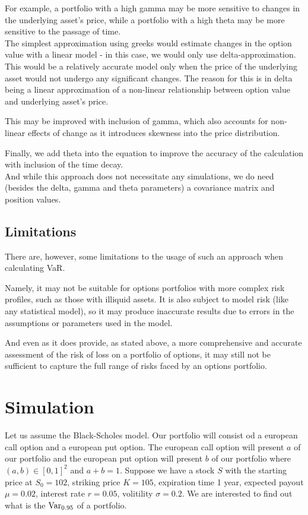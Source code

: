 \documentclass[a4paper, 12pt]{article}
\theoremstyle{definition}
\theoremstyle{plain}
\theoremstyle{definition}
\begin{document}
For example, a portfolio with a high gamma may be 
more sensitive to changes in the 
underlying asset's price, 
while a portfolio with a high theta 
may be more sensitive to the passage 
of time.\\


The simplest approximation using greeks would estimate changes 
in the option value with a linear model - in this case, we would 
only use delta-approximation. This would be a relatively accurate 
model only when the price of the underlying asset would not undergo any 
significant changes. The reason for this is in delta being a linear 
approximation of a non-linear relationship between option value and underlying 
asset's price. 

This may be improved with inclusion of gamma, which also accounts for 
non-linear effects of change as it introduces skewness into the price distribution.


Finally, we add theta into the equation to improve the accuracy of the calculation 
with inclusion of the time decay.\\

And while this approach does not necessitate any simulations,
we do need (besides the delta, gamma and theta 
parameters) a covariance matrix and position values. 



\subsection{Limitations}

There are, however, some limitations to the usage of such an approach
when calculating VaR. 

Namely, it may not be suitable for options portfolios with more complex 
risk profiles, such as those with illiquid assets. 
It is also subject to model risk (like any statistical model),
so it may produce inaccurate results due to errors in the 
assumptions or parameters used in the model.

And even as it does provide, as stated above, 
a more comprehensive and accurate assessment of the risk 
of loss on a portfolio of options, it may still not be 
sufficient to capture the full range of risks faced by 
an options portfolio.

\section{Simulation}

Let us assume the Black-Scholes model.
Our portfolio will consist od a european 
call option and a european put option.
The european call option will present 
$a$ of our portfolio and the  european put option
will present $b$ of our portfolio 
where $(a,b) \in [0,1]^2$ and $a+b=1$.
Suppose we have a stock $S$ with the starting price 
at $S_0 = 102$, striking price $K=105$, expiration time 
1 year, expected payout $\mu = 0.02$, interest rate
$r = 0.05$, volitility $\sigma = 0.2$.
We are interested to find out what is the 
$\textnormal{Var}_{0.95}$ of a portfolio.
\end{document}
